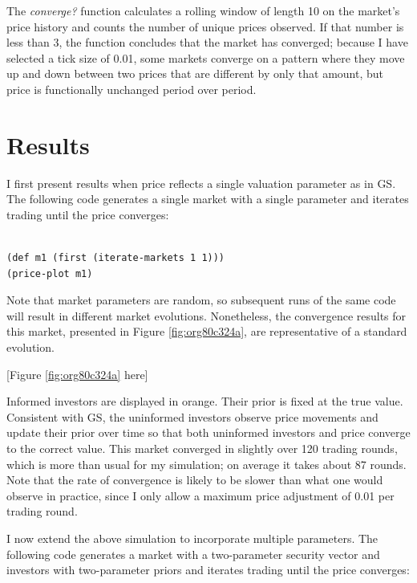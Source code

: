\documentclass[11pt]{article}
\begin{document}
The \emph{converge?} function calculates a rolling window of length 10 on the market's price history and counts the number of unique prices observed. If that number is less than 3, the function concludes that the market has converged; because I have selected a tick size of 0.01, some markets converge on a pattern where they move up and down between two prices that are different by only that amount, but price is functionally unchanged period over period.

\section{Results}
\label{sec:org663ecdd}
I first present results when price reflects a single valuation parameter as in GS. The following code generates a single market with a single parameter and iterates trading until the price converges:

\singlespacing

\lstset{language=Lisp,label= ,caption= ,captionpos=b,numbers=none}
\begin{lstlisting}

(def m1 (first (iterate-markets 1 1)))
(price-plot m1)

\end{lstlisting}
\doublespacing

Note that market parameters are random, so subsequent runs of the same code will result in different market evolutions. Nonetheless, the convergence results for this market, presented in Figure \ref{fig:org80c324a}, are representative of a standard evolution. 

\begin{center}
[Figure \ref{fig:org80c324a} here]
\end{center}

Informed investors are displayed in orange. Their prior is fixed at the true value. Consistent with GS, the uninformed investors observe price movements and update their prior over time so that both uninformed investors and price converge to the correct value. This market converged in slightly over 120 trading rounds, which is more than usual for my simulation; on average it takes about 87 rounds. Note that the rate of convergence is likely to be slower than what one would observe in practice, since I only allow a maximum price adjustment of 0.01 per trading round.

I now extend the above simulation to incorporate multiple parameters. The following code generates a market with a two-parameter security vector and investors with two-parameter priors and iterates trading until the price converges:
\end{document}
